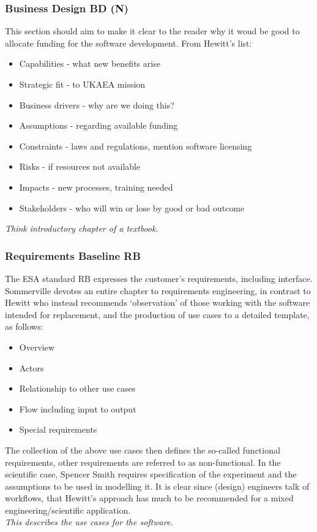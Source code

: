 \subsubsection{Business Design BD (N)}\label{sec:BD}
This section should aim to make it clear to the reader
why it woud be good to allocate funding for the software development.
From Hewitt's list:
\begin{itemize}
\item Capabilities - what new benefits arise
\item Strategic fit - to UKAEA mission
\item Business drivers - why are we doing this?
\item Assumptions - regarding available funding
\item Constraints - laws and regulations, mention software licensing
\item Risks -  if resources not available
\item Impacts - new processes, training needed
\item Stakeholders - who will win or lose by good or bad outcome
\end{itemize}
\emph{Think introductory chapter of a textbook.}
\subsubsection{Requirements Baseline RB}\label{sec:RB}
The ESA standard RB expresses the customer's requirements, including interface. Sommerville devotes an
entire chapter to requirements engineering, in contrast to Hewitt who
instead recommends `observation' of those working with the software intended for replacement,
and the production of use cases to a detailed template, as follows:
\begin{itemize}
\item Overview
\item Actors
\item Relationship to other use cases
\item Flow including input to output
\item Special requirements
\end{itemize}
The collection of the above use cases then defines the so-called functional requirements,
other requirements are referred to as non-functional. In the scientific case, Spencer Smith
requires specification of the experiment and the assumptions to be used in modelling it.
It is clear since (design) engineers talk of workflows, that Hewitt's approach has much to be recommended
for a mixed engineering/scientific application. \\ 
\emph{This describes the use cases for the software.}
